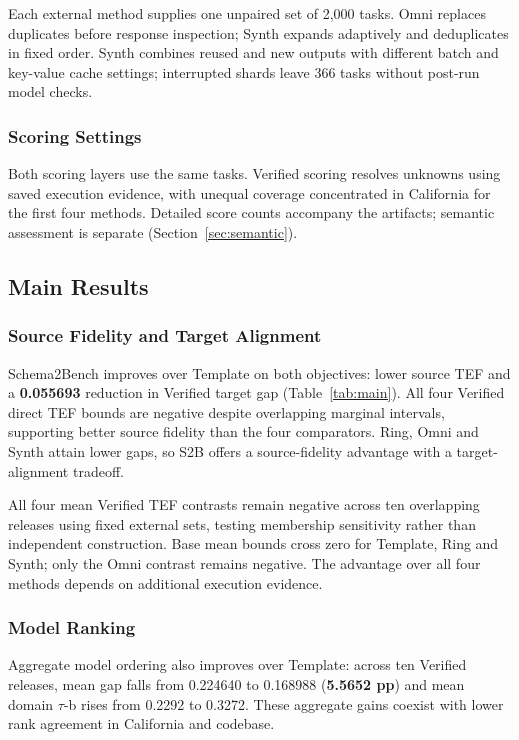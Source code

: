 Each external method supplies one unpaired set of 2,000 tasks. Omni replaces duplicates before response inspection; Synth expands adaptively and deduplicates in fixed order. Synth combines reused and new outputs with different batch and key-value cache settings; interrupted shards leave 366 tasks without post-run model checks.


\subsubsection{Scoring Settings}
Both scoring layers use the same tasks. Verified scoring resolves unknowns using saved execution evidence, with unequal coverage concentrated in California for the first four methods. Detailed score counts accompany the artifacts; semantic assessment is separate (Section~\ref{sec:semantic}).


\subsection{Main Results}\label{sec:measurement}


\subsubsection{Source Fidelity and Target Alignment}
Schema2Bench improves over Template on both objectives: lower source TEF and a \textbf{0.055693} reduction in Verified target gap (Table~\ref{tab:main}). All four Verified direct TEF bounds are negative despite overlapping marginal intervals, supporting better source fidelity than the four comparators. Ring, Omni and Synth attain lower gaps, so S2B offers a source-fidelity advantage with a target-alignment tradeoff.

All four mean Verified TEF contrasts remain negative across ten overlapping releases using fixed external sets, testing membership sensitivity rather than independent construction. Base mean bounds cross zero for Template, Ring and Synth; only the Omni contrast remains negative. The advantage over all four methods depends on additional execution evidence.

\subsubsection{Model Ranking}
Aggregate model ordering also improves over Template: across ten Verified releases, mean gap falls from 0.224640 to 0.168988 (\textbf{5.5652 pp}) and mean domain $\tau$-b rises from 0.2292 to 0.3272. These aggregate gains coexist with lower rank agreement in California and codebase.

